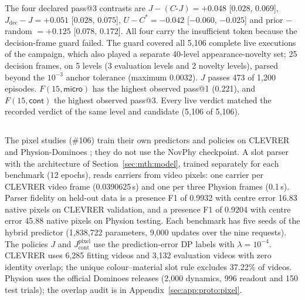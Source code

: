\begin{revblock}
The four declared pass@3 contrasts are $J-(C\text{-}J)=+0.048$ [$0.028$, $0.069$], $J_{\mathrm{dec}}-J=+0.051$ [$0.028$, $0.075$], $U-C^{*}=-0.042$ [$-0.060$, $-0.025$] and prior $-$ random $=+0.125$ [$0.078$, $0.172$]. All four carry the insufficient token because the decision-frame guard failed. The guard covered all 5,106 complete live executions of the campaign, which also played a separate 40-level appearance-novelty set; 25 decision frames, on 5 levels (3 evaluation levels and 2 novelty levels), parsed beyond the $10^{-3}$ anchor tolerance (maximum 0.0032). $J$ passes 473 of 1,200 episodes. $F(15,\textsf{micro})$ has the highest observed pass@1 (0.221), and $F(15,\textsf{cont})$ the highest observed pass@3. Every live verdict matched the recorded verdict of the same level and candidate (5,106 of 5,106).
\end{revblock}

\subsection{\texorpdfstring{}{Pixel-carrier studies: full tables and downstream readouts}}
\label{sec:app:res:pixel}

\begin{revblock}
\nopagebreak
The pixel studies (\#106) train their own predictors and policies on CLEVRER \citep{yi2020clevrer} and Physion-Dominoes \citep{bear2021physion}; they do not use the NovPhy checkpoint. A slot parser with the architecture of Section~\ref{sec:mth:model}, trained separately for each benchmark (12 epochs), reads carriers from video pixels: one carrier per CLEVRER video frame (0.0390625\,s) and one per three Physion frames (0.1\,s). Parser fidelity on held-out data is a presence F1 of 0.9932 with centre error 16.83 native pixels on CLEVRER validation, and a presence F1 of 0.9204 with centre error 45.88 native pixels on Physion testing. Each benchmark has five seeds of the hybrid predictor (1,838,722 parameters, 9,000 updates over the nine requests). The policies $J$ and $J_{\mathrm{cont}}^{\mathrm{pixel}}$ use the prediction-error DP labels with $\lambda=10^{-4}$. CLEVRER uses 6,285 fitting videos and 3,132 evaluation videos with zero identity overlap; the unique colour--material slot rule excludes 37.22\% of videos. Physion uses the official Dominoes releases (2,000 dynamics, 996 readout and 150 test trials); the overlap audit is in Appendix~\ref{sec:app:proto:pixel}.
\end{revblock}

